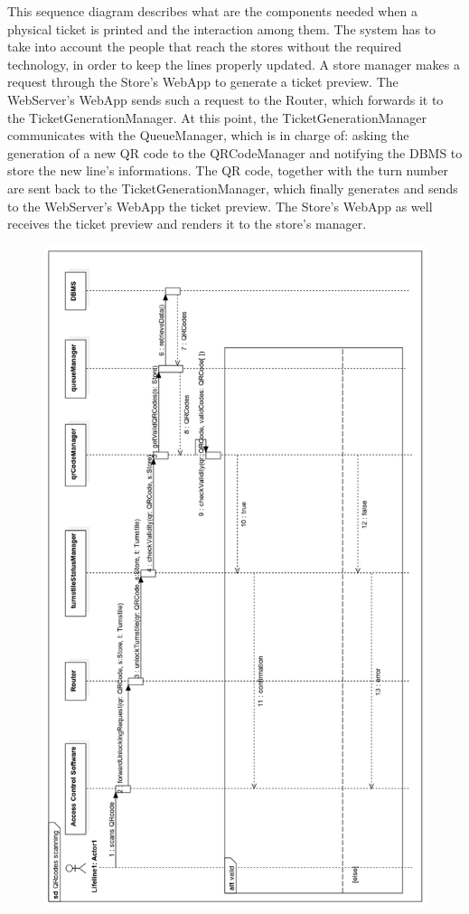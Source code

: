 \documentclass{article}
\begin{document}
This sequence diagram describes what are the components needed when a physical ticket is printed and the interaction among them. The system has to take into account the people that reach the stores without the required technology, in order to keep the lines properly updated. A store manager makes a request through the Store’s WebApp to generate a ticket preview. The WebServer’s WebApp sends such a request to the Router, which forwards it to the TicketGenerationManager. At this point, the TicketGenerationManager communicates with the QueueManager, which is in charge of: asking the generation of a new QR code to the QRCodeManager and notifying the DBMS to store the new line’s  informations. The QR code, together with the turn number are sent back to the TicketGenerationManager, which finally generates and sends to the WebServer’s WebApp the ticket preview. The Store’s WebApp as well receives the ticket preview and renders it to the store’s manager.
\begin{figure}[H]
  \includegraphics[width=\linewidth]{QrRT.png}
  
\end{figure}
\end{document}
